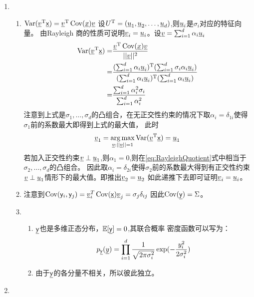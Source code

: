 \documentclass[a4paper]{article}
\begin{document}
\begin{enumerate}[label=\thehwcnt.\arabic*.]
\begin{enumerate}[label=(\alph*)]
\begin{enumerate}[label=\roman*.]
      \end{enumerate}      
    \end{enumerate}
  \item 
  \begin{enumerate}[label=(\alph*)]
  \item
    $\operatorname{Var}(\underline{v}^{\mathrm{T}} \underline{\mathsf{x}})=\underline{v}^{\mathrm{T}}\operatorname{Cov}(\underline{x})\underline{v}$
    设$U^{\mathrm{T}}=(\underline{u}_1,\underline{u}_2,\dots,\underline{u}_d)$,则$\underline{u}_i$是$\sigma_i$对应的特征向量。
    由Rayleigh 商的性质可说明$\underline{v}_i=\underline{u}_i$。设$\underline{v}=\sum_{i=1}^d \alpha_i \underline{u}_i$
    \begin{align}
    \operatorname{Var}(\underline{v}^{\mathrm{T}} \underline{\mathsf{x}})=& \frac{\underline{v}^{\mathrm{T}}\operatorname{Cov}(\underline{x})\underline{v}}{||\underline{v}||^2}\nonumber\\
    = & \frac{(\sum_{i=1}^d \alpha_i \underline{u}_i)^{\mathrm{T}}(\sum_{i=1}^d \sigma_i\alpha_i \underline{u}_i)}{(\sum_{i=1}^d \alpha_i \underline{u}_i)^{\mathrm{T}}(\sum_{i=1}^d \alpha_i \underline{u}_i)}\nonumber\\
    = & \frac{\sum_{i=1}^d \alpha^2_i \sigma_i}{\sum_{i=1}^d \alpha^2_i}\label{eq:RayleighQuotient}
    \end{align}
    注意到上式是$\sigma_1,\dots,\sigma_d$的凸组合，在无正交性约束的情况下取$\alpha_i=\delta_{1i}$使得$\sigma_1$前的系数最大即得到上式的最大值，
    此时
    \begin{equation}
    \underline{v}_1=\operatorname*{arg\,max}_{\underline{v}:||\underline{v}||=1} \operatorname{Var}(\underline{v}^{\mathrm{T}} \underline{\mathsf{x}})=\underline{u}_1
    \end{equation}
    若加入正交性约束$\underline{v}\perp\underline{u}_1$,则$\alpha_1=0$,则在\eqref{eq:RayleighQuotient}式中相当于$\sigma_2,\dots,\sigma_d$的凸组合。
    因此取$\alpha_i=\delta_{2i}$使得$\sigma_2$前的系数最大得到有正交性约束$\underline{v}\perp\underline{u}_1$情形下的最大值。即推出$\underline{v}_2=\underline{u}_2$
    如此递推下去即可证明$\underline{v}_i=\underline{u}_i$。
  \item
    注意到$\operatorname{Cov}(\mathsf{y}_i,\mathsf{y}_j)=\underline{v}_i^T \operatorname{Cov}(\underline{\mathsf{x}})\underline{v}_j=\sigma_j \delta_{ij}$
    因此$\operatorname{Cov}(\underline{\mathsf{y}})=\Sigma$。
  \item
    \begin{enumerate}[label=\roman*.]
        \item $\underline{\mathsf{y}}$也是多维正态分布，$\operatorname{\mathbb{E}}[\underline{\mathsf{y}}]=0$,其联合概率
        密度函数可以写为：
        \begin{equation}
            p_{\underline{\mathsf{y}}}(\underline{y})=\prod_{i=1}^d \frac{1}{\sqrt{2\pi \sigma_i^2}}\exp(-\frac{y_i^2}{2\sigma_i^2})
        \end{equation}
        \item 由于$\underline{\mathsf{y}}$的各分量不相关，所以彼此独立。
    \end{enumerate}
  \end{enumerate}  
  \item  

\end{enumerate}
\end{document}
